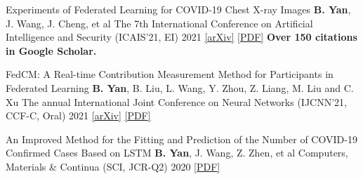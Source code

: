 \begin{cvpublications}

\cvpublication
{Experiments of Federated Learning for COVID-19 Chest X-ray Images} %
{\textbf{B. Yan}, J. Wang, J. Cheng, et al} %
{The 7th International Conference on Artificial Intelligence and Security (ICAIS'21, EI)} %
{2021} %
{
	\href{https://arxiv.org/abs/2007.05592}{[arXiv]} \href{https://link.springer.com/chapter/10.1007/978-3-030-78618-2_4}{[PDF]}
	\textbf{Over 150 citations in Google Scholar.} 
} %


\cvpublication
{FedCM: A Real-time Contribution Measurement Method for Participants in Federated Learning} %
{\textbf{B. Yan}, B. Liu, L. Wang, Y. Zhou, Z. Liang, M. Liu and C. Xu} %
{The annual International Joint Conference on Neural Networks (IJCNN'21, CCF-C, Oral)} %
{2021} %
{\href{https://arxiv.org/abs/2009.03510}{[arXiv]} \href{https://ieeexplore.ieee.org/abstract/document/9534451/}{[PDF]}} %


\cvpublication
{An Improved Method for the Fitting and Prediction of the Number of COVID-19 Confirmed Cases Based on LSTM} %
{\textbf{B. Yan}, J. Wang, Z. Zhen, et al} %
{Computers, Materials \& Continua (SCI, JCR-Q2)} %
{2020} %
{\href{https://www.techscience.com/cmc/v64n3/39440/pdf}{[PDF]}} %



\end{cvpublications}






